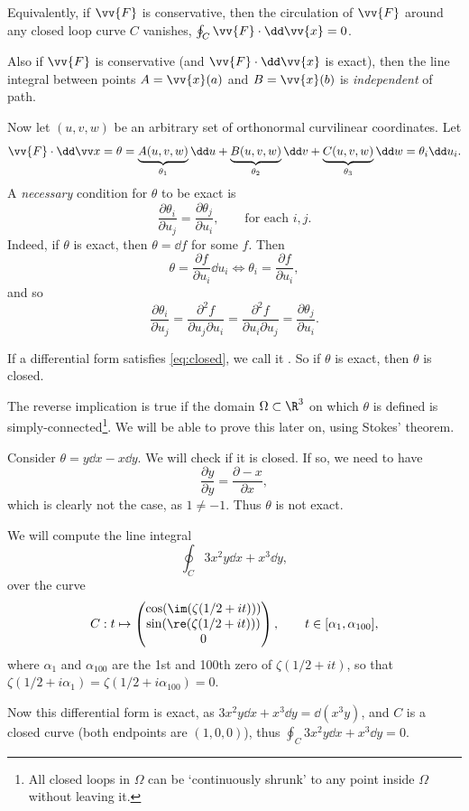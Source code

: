 Equivalently, if $\vv{F}$ is conservative, then the circulation of $\vv{F}$ around any closed loop curve $C$ vanishes,  $\oint_C \vv{F} \cdot \dd \vv{x} = 0$.

Also if $\vv{F}$ is conservative (and $\vv{F} \cdot \dd \vv{x}$ is exact), then the line integral between points $A = \vv{x}(a)$ and $B = \vv{x}(b)$ is \emph{independent} of path.

Now let $(u, v, w)$ be an arbitrary set of orthonormal curvilinear coordinates. Let
$$
\vv{F} \cdot \dd \vv x = \theta = \underbrace{A(u, v, w)}_{\theta_1} \dd u + \underbrace{B(u, v, w)}_{\theta_2} \dd v + \underbrace{C(u, v, w)}_{\theta_3} \dd w = \theta_i \dd u_i.
$$
A \emph{necessary} condition for $\theta$ to be exact is
$$
	\frac{\partial \theta_i}{\partial u_j} = \frac{\partial \theta_j}{\partial u_i}, \quad \quad \text{for each }i, j.
$$
Indeed, if $\theta$ is exact, then $\theta = \dd f$ for some $f$. Then
\begin{equation}\label{eq:closed}
	\theta = \frac{\partial f}{\partial u_i} \dd u_i \iff \theta_i = \frac{\partial f}{\partial u_i},\tag{$*$}
\end{equation}
and so
$$
	\frac{\partial \theta_i}{\partial u_j} = \frac{\partial^2 f}{\partial u_j \partial u_i} = \frac{\partial^2 f}{\partial u_i \partial u_j} = \frac{\partial \theta_j}{ \partial u_i}.
$$

If a differential form satisfies \eqref{eq:closed}, we call it . So if $\theta$ is exact, then $\theta$ is closed.

The reverse implication is true if the domain $\Omega \subset \R^3$ on which $\theta$ is defined is simply-connected\footnote{All closed loops in $\Omega$ can be `continuously shrunk' to any point inside $\Omega$ without leaving it.}. We will be able to prove this later on, using Stokes' theorem.

\begin{example}
	Consider $\theta = y \dd x - x \dd y$. We will check if it is closed. If so, we need to have
	$$
	\frac{\partial y}{\partial y} = \frac{\partial -x}{\partial x},
	$$
	which is clearly not the case, as $1 \neq -1$. Thus $\theta$ is not exact.
\end{example}

\begin{example}
	We will compute the line integral
	$$
	\oint_C 3x^2 y \dd x + x^3 \dd y,
	$$
	over the curve
	$$
	C: t \mapsto \begin{pmatrix}
		\cos(\im(\zeta(1/2 + it))) \\
		\sin(\re(\zeta(1/2 + it))) \\
		0
	\end{pmatrix}, \quad \quad t \in [\alpha_1, \alpha_{100}],
	$$
	where $\alpha_1$ and $\alpha_{100}$ are the 1st and 100th zero of $\zeta(1/2 + it)$, so that $\zeta(1/2 + i \alpha_1) = \zeta(1/2 + i \alpha_{100}) = 0$.
	
	Now this differential form is exact, as $3x^2 y \dd x + x^3 \dd y = \dd (x^3 y)$, and $C$ is a closed curve (both endpoints are $(1, 0, 0)$), thus $\oint_C 3x^2 y \dd x + x^3 \dd y = 0$.
\end{example}

